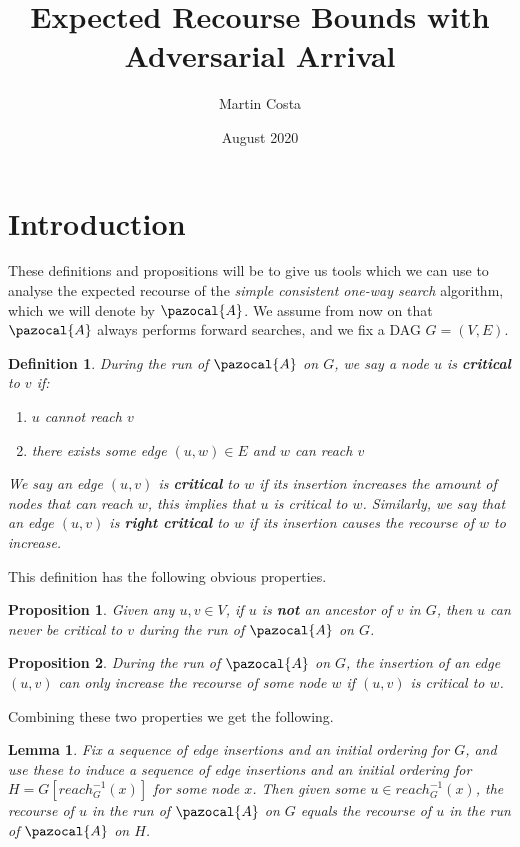 \documentclass{article}
\title{Expected Recourse Bounds with Adversarial Arrival}
\author{Martin Costa}
\date{August 2020}
\newtheorem{lemma}{Lemma}
\newtheorem{proposition}{Proposition}
\newtheorem{definition}{Definition}
\begin{document}
\maketitle

\section{Introduction}

These definitions and propositions will be to give us tools which we can use to analyse the expected recourse of the \textit{simple consistent one-way search} algorithm, which we will denote by $\pazocal{A}$. We assume from now on that $\pazocal{A}$ always performs forward searches, and we fix a DAG $G=(V,E)$.

\begin{definition}
During the run of $\pazocal{A}$ on $G$, we say a node $u$ is \textbf{critical} to $v$ if:
\begin{enumerate}
    \item $u$ cannot reach $v$
    \item there exists some edge $(u,w) \in E$ and $w$ can reach $v$ 
\end{enumerate}
We say an edge $(u,v)$ is \textbf{critical} to $w$ if its insertion increases the amount of nodes that can reach $w$, this implies that $u$ is critical to $w$. Similarly, we say that an edge $(u,v)$ is \textbf{right critical} to $w$ if its insertion causes the recourse of $w$ to increase.
\end{definition}

This definition has the following obvious properties.

\begin{proposition}
Given any $u,v \in V$, if $u$ is \textbf{not} an ancestor of $v$ in $G$, then $u$ can never be critical to $v$ during the run of $\pazocal{A}$ on $G$. 
\end{proposition}

\begin{proposition}
During the run of $\pazocal{A}$ on $G$, the insertion of an edge $(u,v)$ can only increase the recourse of some node $w$ if $(u,v)$ is critical to $w$.
\end{proposition}

Combining these two properties we get the following.

\begin{lemma}
Fix a sequence of edge insertions and an initial ordering for $G$, and use these to induce a sequence of edge insertions and an initial ordering for $H = G[reach^{-1}_{G}(x)]$ for some node $x$. Then given some $u \in reach^{-1}_{G}(x)$, the recourse of $u$ in the run of $\pazocal{A}$ on $G$ equals the recourse of $u$ in the run of $\pazocal{A}$ on $H$.
\end{lemma}
\end{document}
